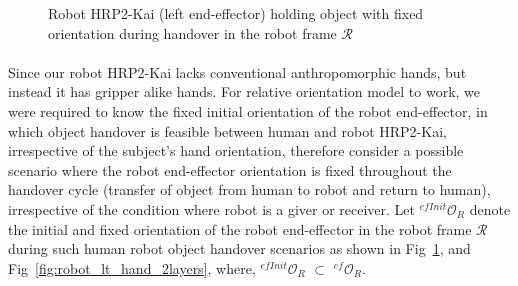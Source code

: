 \begin{figure}[h]
	\caption{Robot HRP2-Kai (left end-effector) holding object with fixed orientation during handover in the robot frame $\mathcal{R}$}
	\label{fig:robot_lt_hand_obj}
\end{figure} 

\paragraph*{}
Since our robot HRP2-Kai lacks conventional anthropomorphic hands, but instead it has gripper alike hands. For relative orientation model to work, we were required to know the fixed initial orientation of the robot end-effector, in which object handover is feasible between human and robot HRP2-Kai, irrespective of the subject's hand orientation, therefore consider a possible  scenario where the robot end-effector orientation is fixed throughout the handover cycle (transfer of object from human to robot and return to human), irrespective of the condition where robot is a giver or receiver. Let ${{}^{efInit}\mathcal{O}_R}$ denote the initial and fixed orientation of the robot end-effector in the robot frame $\mathcal{R}$ during such human robot object handover scenarios as shown in Fig~\ref{fig:robot_lt_hand_obj}, and Fig~\ref{fig:robot_lt_hand_2layers}, where, ${{}^{efInit}\mathcal{O}_R}$ $\subset$ ${{}^{ef}\mathcal{O}_R}$.

